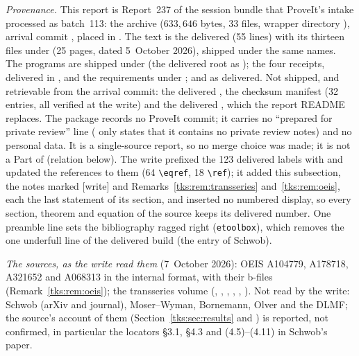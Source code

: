 \begin{writenote}\raggedright
\emph{Provenance.} This report is Report~237 of the session bundle that
ProveIt's  intake processed as batch~113: the archive
 ($633{,}646$ bytes, 33 files, wrapper directory
), arrival commit , placed in
. The text is the delivered  (55 lines)
with its thirteen \verb|| files under  (25 pages, dated
5~October 2026), shipped under the same names. The programs are shipped under
 (the delivered root  as ); the
four receipts, delivered in , and the requirements under
;  and  as delivered. Not
shipped, and retrievable from the arrival commit: the delivered
, the checksum manifest  (32
entries, all verified at the write) and the delivered , which
the report README replaces. The package records no ProveIt commit; it carries
no ``prepared for private review'' line ( only states that
it contains no private review notes) and no personal data. It is a
single-source report, so no merge choice was made; it is not a Part of
 (relation below). The write prefixed
the 123 delivered labels with  and updated the references to
them (64 \verb|\eqref|, 18 \verb|\ref|); it added this subsection, the notes marked [write] and
Remarks~\ref{tks:rem:transseries} and~\ref{tks:rem:oeis}, each the last
statement of its section, and inserted no numbered display, so every section,
theorem and equation of the source keeps its delivered number. One preamble
line sets the bibliography ragged right (\texttt{etoolbox}), which removes the
one underfull line of the delivered build (the entry of Schwob).

\emph{The sources, as the write read them} (7~October 2026): OEIS A104779,
A178718, A321652 and A068313 in the internal format, with their b-files
(Remark~\ref{tks:rem:oeis}); the transseries volume
(, , ,
, ,
). Not read by the write: Schwob (arXiv and
journal), Moser--Wyman, Bornemann, Olver and the DLMF; the source's account
of them (Section~\ref{tks:sec:results} and ) is reported, not
confirmed, in particular the locators \S3.1, \S4.3 and (4.5)--(4.11) in
Schwob's paper.


\end{writenote}
